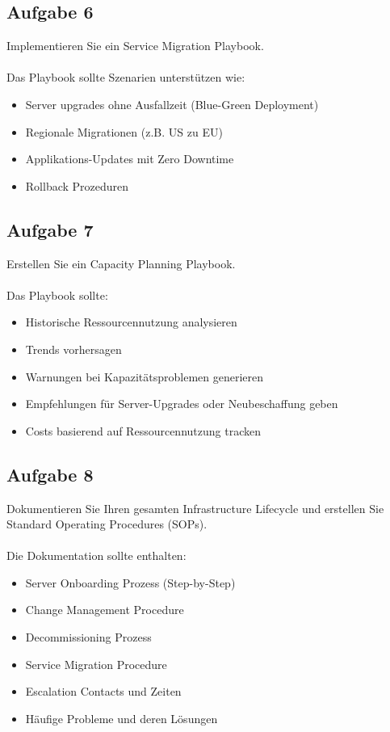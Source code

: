 \documentclass{article}
\begin{document}
    \subsection{Aufgabe 6}
    Implementieren Sie ein Service Migration Playbook.
    \\ \\
    Das Playbook sollte Szenarien unterstützen wie:
    \begin{itemize}
        \item Server upgrades ohne Ausfallzeit (Blue-Green Deployment)
        \item Regionale Migrationen (z.B. US zu EU)
        \item Applikations-Updates mit Zero Downtime
        \item Rollback Prozeduren
    \end{itemize}

    \subsection{Aufgabe 7}
    Erstellen Sie ein Capacity Planning Playbook.
    \\ \\
    Das Playbook sollte:
    \begin{itemize}
        \item Historische Ressourcennutzung analysieren
        \item Trends vorhersagen
        \item Warnungen bei Kapazitätsproblemen generieren
        \item Empfehlungen für Server-Upgrades oder Neubeschaffung geben
        \item Costs basierend auf Ressourcennutzung tracken
    \end{itemize}

    \subsection{Aufgabe 8}
    Dokumentieren Sie Ihren gesamten Infrastructure Lifecycle und erstellen Sie Standard Operating Procedures (SOPs).
    \\ \\
    Die Dokumentation sollte enthalten:
    \begin{itemize}
        \item Server Onboarding Prozess (Step-by-Step)
        \item Change Management Procedure
        \item Decommissioning Prozess
        \item Service Migration Procedure
        \item Escalation Contacts und Zeiten
        \item Häufige Probleme und deren Lösungen
    \end{itemize}
\end{document}
